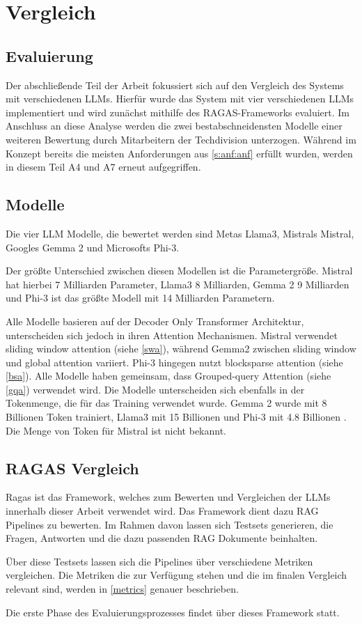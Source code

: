 \chapter{Vergleich}
\label{vergleich}

\section{Evaluierung}
Der abschließende Teil der Arbeit fokussiert sich auf den Vergleich
des Systems mit verschiedenen LLMs. Hierfür wurde das System mit vier 
verschiedenen LLMs implementiert und 
wird zunächst mithilfe des RAGAS-Frameworks evaluiert. 
Im Anschluss an diese Analyse werden die zwei bestabschneidensten Modelle 
einer weiteren Bewertung durch Mitarbeitern der Techdivision unterzogen. 
Während im Konzept bereits die meisten Anforderungen aus \ref*{s:anf:anf} 
erfüllt wurden, werden in diesem Teil A4 und A7 erneut aufgegriffen.

\section*{Modelle}
Die vier LLM Modelle, die bewertet werden sind Metas Llama3,
Mistrals Mistral, Googles Gemma 2 und Microsofts Phi-3.\par
Der größte Unterschied zwischen diesen Modellen 
ist die Parametergröße. Mistral hat hierbei 7 Milliarden
Parameter, Llama3 8 Milliarden, Gemma 2 9 Milliarden und Phi-3 ist das größte Modell
mit 14 Milliarden Parametern.\par
Alle Modelle basieren auf der Decoder Only Transformer Architektur, 
unterscheiden sich jedoch in ihren Attention Mechanismen.
Mistral verwendet
sliding window attention (siehe \ref*{swa}), während 
 Gemma2 zwischen sliding window und global attention variiert.
 Phi-3 hingegen nutzt blocksparse attention (siehe \ref*{bsa}). 
 Alle Modelle haben gemeinsam, dass  
 Grouped-query Attention (siehe \ref*{gqa}) verwendet wird. 
 Die Modelle unterscheiden sich ebenfalls in der Tokenmenge, die für das 
 Training verwendet wurde.
Gemma 2 wurde mit 8 Billionen Token trainiert, Llama3 mit 
15 Billionen und Phi-3 mit 4.8 Billionen \cite{Mistral, IntroducingMetaLlama, abdinPhi3TechnicalReport2024, gemmateamGemmaImprovingOpen2024}. Die Menge von Token
für Mistral ist nicht bekannt.

\section{RAGAS Vergleich}
Ragas ist das Framework, welches zum Bewerten und Vergleichen der 
LLMs innerhalb dieser Arbeit verwendet wird.
Das Framework dient dazu RAG Pipelines zu bewerten. Im Rahmen
davon lassen sich Testsets generieren, die Fragen, Antworten 
und die dazu passenden RAG Dokumente beinhalten. \par
Über diese Testsets lassen sich die Pipelines über verschiedene 
Metriken vergleichen. Die Metriken die zur Verfügung stehen und 
die im finalen Vergleich relevant sind, werden in \ref*{metrics}
genauer beschrieben.\par
Die erste Phase des Evaluierungsprozesses findet über dieses Framework statt.
\par

